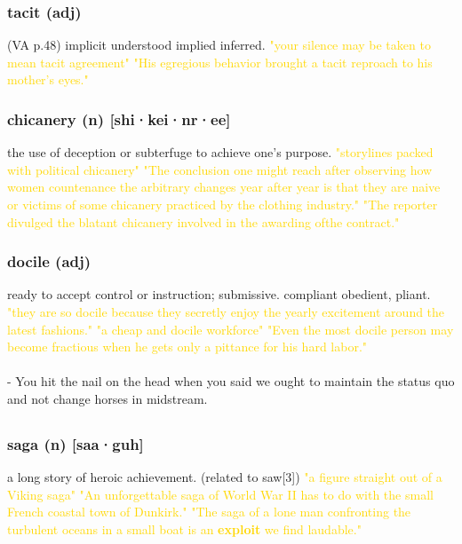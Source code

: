 \documentclass{proc}
\begin{document}
	\subsubsection{\textcolor{brickred}{tacit} (adj)}
	(VA p.48) implicit
	understood
	implied
	inferred.
	\textcolor{gold}{"your silence may be taken to mean tacit agreement" "His egregious behavior brought a tacit reproach  to his mother's eyes."}
	
	\subsubsection{\textcolor{brickred}{chicanery} (n) [shi·kei·nr·ee]}
	the use of deception or subterfuge to achieve one's purpose.
	\textcolor{gold}{"storylines packed with political chicanery" "The conclusion one might reach after observing how women countenance the arbitrary changes year after year is that they are naive or victims of some chicanery practiced by the clothing industry." "The reporter divulged the blatant chicanery involved in the awarding ofthe contract."}
	
	\subsubsection{\textcolor{brickred}{docile} (adj)}
	ready to accept control or instruction; submissive. compliant
	obedient,
	pliant.
	\textcolor{gold}{"they are so docile because they secretly enjoy the yearly excitement around the latest fashions." "a cheap and docile workforce" "Even the most docile person may become fractious when he gets only a pittance for his hard labor."}\\\\
	- You hit the nail on the head when you said we ought to maintain the status quo and not change horses in midstream.
	
	\newpage
	\setcounter{section}{39}
	\setcounter{subsection}{0}
	
	
	\subsection{}
	\subsubsection{\textcolor{brickred}{saga} (n) [saa·guh]}
	a long story of heroic achievement. (related to saw[3])
	\textcolor{gold}{"a figure straight out of a Viking saga" "An unforgettable saga of World War II has to do with the small French coastal town of Dunkirk." "The saga of a lone man confronting the turbulent oceans in a small boat is an \textbf{exploit} we find laudable."}
	
\end{document}
